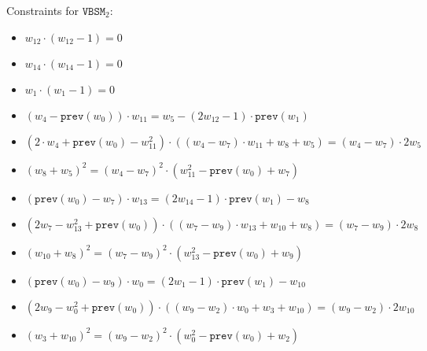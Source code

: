 Constraints for $\texttt{VBSM}_2$:
\begin{itemize}
    \item $w_{12} \cdot (w_{12} - 1) = 0$
    \item $w_{14} \cdot (w_{14} - 1) = 0$
    \item $w_1 \cdot (w_1 - 1) = 0$
    \item $(w_{4} - \texttt{prev}(w_{0})) \cdot w_{11} = w_5 - (2w_{12} - 1) \cdot \texttt{prev}(w_{1})$
    \item $(2 \cdot w_{4} + \texttt{prev}(w_{0}) - w_{11}^2) \cdot ((w_{4} - w_7) \cdot w_{11} + w_8 + w_5) = (w_{4} - w_7) \cdot 2w_5$
    \item $(w_8 + w_5)^2 = (w_{4} - w_7)^2 \cdot (w_{11}^2 - \texttt{prev}(w_{0}) + w_7)$
    \item $(\texttt{prev}(w_{0}) - w_7) \cdot w_{13} = (2w_{14} - 1) \cdot \texttt{prev}(w_{1}) - w_8$
    \item $(2w_7 - w_{13}^2 + \texttt{prev}(w_{0})) \cdot ((w_7 - w_9) \cdot w_{13} + w_{10} + w_8) = (w_7 - w_9) \cdot 2w_8$
    \item $(w_{10} + w_8)^2 = (w_7 - w_9)^2 \cdot (w_{13}^2 - \texttt{prev}(w_{0}) + w_9)$
    \item $(\texttt{prev}(w_{0}) - w_9) \cdot w_0 = (2w_1 - 1) \cdot \texttt{prev}(w_{1}) - w_{10}$
    \item $(2w_9 - w_0^2 + \texttt{prev}(w_{0})) \cdot ((w_9 - w_2) \cdot w_0 + w_{3} + w_{10}) = (w_9 - w_2) \cdot 2w_{10}$
    \item $(w_{3} + w_{10})^2 = (w_9 - w_2)^2 \cdot (w_0^2 - \texttt{prev}(w_{0}) + w_2)$
\end{itemize}


